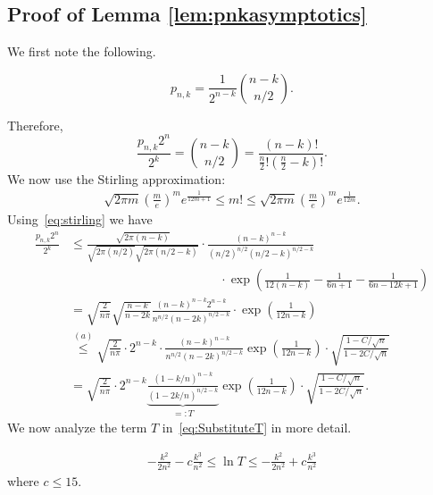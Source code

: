 \subsection{Proof of Lemma \ref{lem:pnkasymptotics}}
    We first note the following. 
    \begin{proposition}\label{prop:pnkexact}
        \[
        p_{n,k} = \frac{1}{2^{n-k}} \binom{n-k}{n/2}.
        \]
    \end{proposition}
    Therefore, 
    \[
    \frac{p_{n,k}2^n}{2^k} = \binom{n-k}{n/2} = \frac{(n-k)!}{\frac{n}{2}!\left(\frac{n}{2}-k\right)!}.
    \]
    We now use the Stirling approximation:
    \begin{align}\label{eq:stirling}
        \sqrt{2\pi m} \left(\frac{m}{e}\right)^m e^{\frac{1}{12m+1}} \le m! \le     \sqrt{2\pi m} \left(\frac{m}{e}\right)^m e^{\frac{1}{12m}}.
    \end{align}
    Using~\cref{eq:stirling} we have 
    \begin{align}
         \frac{p_{n,k}2^n}{2^k} &\le \frac{\sqrt{2\pi(n-k)}}{\sqrt{2\pi(n/2)} \sqrt{2\pi(n/2-k)}} \cdot \frac{(n-k)^{n-k}}{(n/2)^{n/2} (n/2-k)^{n/2-k}} \nonumber\\
         &\qquad\qquad\qquad\qquad\qquad\qquad\cdot \exp{\left(\frac{1}{12(n-k)}-\frac{1}{6n+1}-\frac{1}{6n-12k+1}\right)} \nonumber\\
         &= \sqrt{\frac{2}{n\pi}} \sqrt{\frac{n-k}{n-2k}} \frac{(n-k)^{n-k}2^{n-k}}{n^{n/2}(n-2k)^{n/2-k}}\cdot\exp{\left(\frac{1}{12n-k}\right)} \nonumber\\
         &\stackrel{(a)}{\le} \sqrt{\frac{2}{n\pi}} \cdot 2^{n-k} \cdot\frac{(n-k)^{n-k}}{n^{n/2}(n-2k)^{n/2-k}} \exp\left(\frac{1}{12n-k}\right) \cdot\sqrt{\frac{1-C/\sqrt{n}}{1-2C/\sqrt{n}}} \nonumber\\
         &=  \sqrt{\frac{2}{n\pi}} \cdot 2^{n-k} \underbrace{\frac{(1-k/n)^{n-k}}{(1-2k/n)^{n/2-k}}}_{=: T}\exp\left(\frac{1}{12n-k}\right)\cdot\sqrt{\frac{1-C/\sqrt{n}}{1-2C/\sqrt{n}}}.  \label{eq:SubstituteT}
    \end{align}
    We now analyze the term $T$ in~\cref{eq:SubstituteT} in more detail. 
    \begin{proposition}\label{prop:TaylorSeriesT}
    \begin{align} \label{eq:LnTBds}
            -\frac{k^2}{2n^2} - c\frac{k^3}{n^2} \le \ln T \le  -\frac{k^2}{2n^2} + c\frac{k^3}{n^2}
    \end{align}
    where $c \le 15$. 
    \end{proposition}
